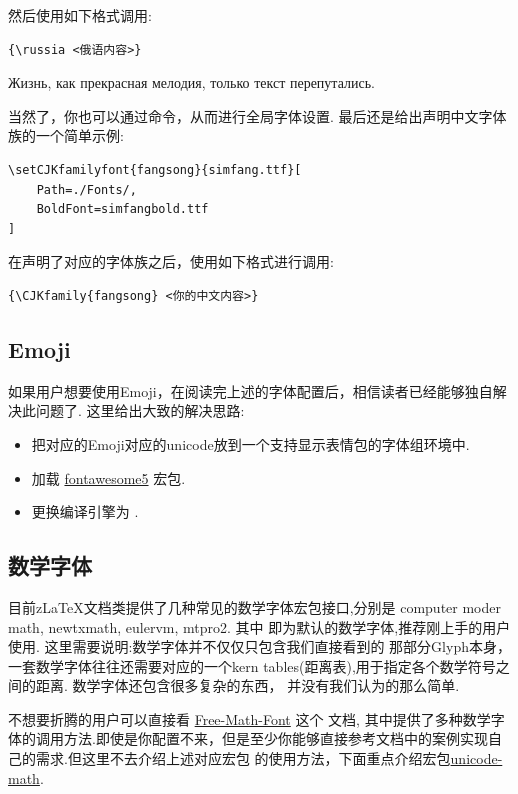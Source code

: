 然后使用如下格式调用:
\begin{verbatim}
{\russia <俄语内容>}
\end{verbatim}

\begin{leftbar}
{\russia Жизнь, как прекрасная мелодия, только текст перепутались.}\par 
{}
\end{leftbar}


当然了，你也可以通过\cmd{\setmainfont}命令，从而进行全局字体设置. 最后还是给出声明中文字体族的一个简单示例:
\begin{verbatim}
\setCJKfamilyfont{fangsong}{simfang.ttf}[
    Path=./Fonts/,
    BoldFont=simfangbold.ttf
]
\end{verbatim}

在声明了对应的字体族之后，使用如下格式进行调用:
\begin{verbatim}
{\CJKfamily{fangsong} <你的中文内容>}
\end{verbatim}

\subsection{Emoji}
如果用户想要使用Emoji，在阅读完上述的字体配置后，相信读者已经能够独自解决此问题了. 这里给出大致的解决思路:
\begin{itemize}
    \item 把对应的Emoji对应的unicode放到一个支持显示表情包的字体组环境中.
    \item 加载 \href{http://mirrors.ctan.org/fonts/fontawesome5/doc/fontawesome5.pdf}{fontawesome5} 宏包.
    \item 更换编译引擎为 .
\end{itemize}


\subsection{数学字体}\label{数学字体}
目前z\LaTeX{}文档类提供了几种常见的数学字体宏包接口,分别是 {computer moder math, newtxmath, eulervm, mtpro2}. 
其中 即为默认的数学字体,推荐刚上手的用户使用. 这里需要说明:数学字体并不仅仅只包含我们直接看到的
那部分Glyph本身，一套数学字体往往还需要对应的一个kern tables(距离表),用于指定各个数学符号之间的距离. 数学字体还包含很多复杂的东西，
并没有我们认为的那么简单.

不想要折腾的用户可以直接看 \href{http://mirrors.ctan.org/info/Free_Math_Font_Survey/en/survey.pdf}{Free-Math-Font} 这个 
文档, 其中提供了多种数学字体的调用方法.即使是你配置不来，但是至少你能够直接参考文档中的案例实现自己的需求.但这里不去介绍上述对应宏包
的使用方法，下面重点介绍宏包\href{http://mirrors.ctan.org/macros/unicodetex/latex/unicode-math/unicode-math.pdf}{unicode-math}. 

